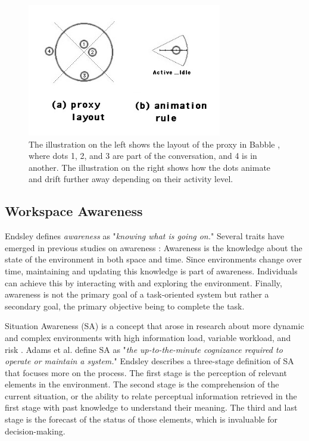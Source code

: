     \begin{figure}
        \centering
        \includegraphics[width=0.5\linewidth]{figures/babble.png}
        \caption{The illustration on the left shows the layout of the proxy in Babble \cite{ericksonSocialTranslucenceApproach2000}, where dots 1, 2, and 3 are part of the conversation, and 4 is in another. The illustration on the right shows how the dots animate and drift further away depending on their activity level.}
        \label{fig:babble}
    \end{figure}

    \subsection{Workspace Awareness} \label{sec:sota_awareness}
    
    Endsley \cite{endsleyTheorySituationAwareness1995} defines \textit{awareness} as "\textit{knowing what is going on.}" Several traits have emerged in previous studies on awareness \cite{adamsSituationAwarenessCognitive1995, normanThingsThatMake1993, endsleyTheorySituationAwareness1995, gutwinDescriptiveFrameworkWorkspace2002}: Awareness is the knowledge about the state of the environment in both space and time. Since environments change over time, maintaining and updating this knowledge is part of awareness. Individuals can achieve this by interacting with and exploring the environment. Finally, awareness is not the primary goal of a task-oriented system but rather a secondary goal, the primary objective being to complete the task.

    Situation Awareness (SA) is a concept that arose in research about more dynamic and complex environments with high information load, variable workload, and risk \cite{gabaSituationAwarenessAnesthesiology1995}. Adams et al. \cite{adamsSituationAwarenessCognitive1995} define SA as "\textit{the up-to-the-minute cognizance required to operate or maintain a system.}" Endsley \cite{endsleyTheorySituationAwareness1995} describes a three-stage definition of SA that focuses more on the process. The first stage is the perception of relevant elements in the environment. The second stage is the comprehension of the current situation, or the ability to relate perceptual information retrieved in the first stage with past knowledge to understand their meaning. The third and last stage is the forecast of the status of those elements, which is invaluable for decision-making.
    
